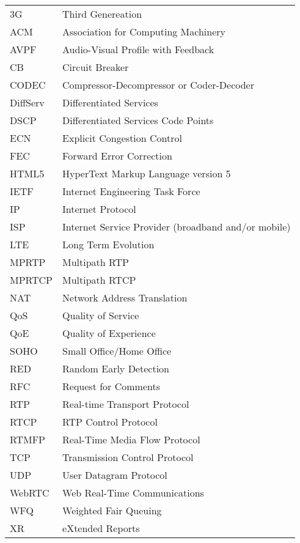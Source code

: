 \begin{longtable}{ll}
3G		& Third Genereation \\
ACM 	& Association for Computing Machinery \\
AVPF	& Audio-Visual Profile with Feedback \\
CB		& Circuit Breaker \\
CODEC	& Compressor-Decompressor or Coder-Decoder \\
DiffServ	& Differentiated Services \\
DSCP 	& Differentiated Services Code Points \\
ECN		& Explicit Congestion Control \\
FEC		& Forward Error Correction \\
HTML5	& HyperText Markup Language version 5\\
IETF	& Internet Engineering Task Force \\
IP		& Internet Protocol \\
ISP 	& Internet Service Provider (broadband and/or mobile)\\
LTE 	& Long Term Evolution \\
MPRTP 	& Multipath RTP \\
MPRTCP	& Multipath RTCP \\
NAT 	& Network Address Translation \\
QoS 	& Quality of Service \\
QoE 	& Quality of Experience \\
SOHO 	& Small Office/Home Office \\
RED 	& Random Early Detection \\
RFC 	& Request for Comments \\
RTP 	& Real-time Transport Protocol \\
RTCP 	& RTP Control Protocol \\
RTMFP	& Real-Time Media Flow Protocol \\
TCP 	& Transmission Control Protocol \\
UDP 	& User Datagram Protocol \\
WebRTC	& Web Real-Time Communications \\
WFQ 	& Weighted Fair Queuing \\
XR		& eXtended Reports \\
\end{longtable}
